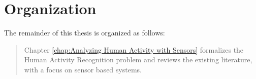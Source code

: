 \documentclass[12pt]{report}
\newcommand{\1}[0]{\mathbbm{1}}
\begin{document}
%
%



\section{Organization}
The remainder of this thesis is organized as follows:
\begin{quote}
    Chapter \ref{chap:Analyzing Human Activity with Sensors} formalizes
    the Human Activity Recognition problem and reviews the existing literature,
    with a focus on sensor based systems.
\end{quote}
\end{document}
